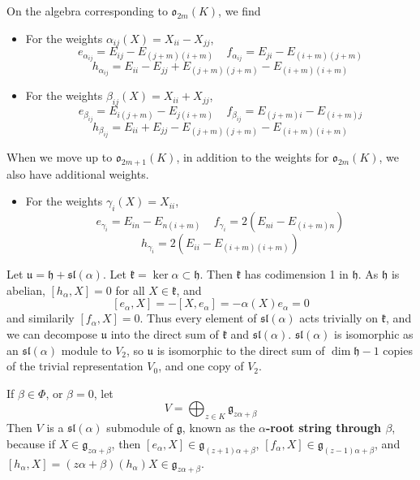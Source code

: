 \begin{example}
    On the algebra corresponding to $\mathfrak{o}_{2m}(K)$, we find
    \begin{itemize}
        \item For the weights $\alpha_{ij}(X) = X_{ii} - X_{jj}$,
        \[ e_{\alpha_{ij}} = E_{ij} - E_{(j+m)(i+m)}\ \ \ \ \ f_{\alpha_{ij}} = E_{ji} - E_{(i+m)(j+m)} \]
        \[ h_{\alpha_{ij}} = E_{ii} - E_{jj} + E_{(j+m)(j+m)} - E_{(i+m)(i+m)} \]

        \item For the weights $\beta_{ij}(X) = X_{ii} + X_{jj}$,
        \[ e_{\beta_{ij}} = E_{i(j+m)} - E_{j(i+m)}\ \ \ \ \ f_{\beta_{ij}} = E_{(j+m)i} - E_{(i+m)j} \]
        \[ h_{\beta_{ij}} = E_{ii} + E_{jj} - E_{(j+m)(j+m)} - E_{(i+m)(i+m)} \]
    \end{itemize}
    When we move up to $\mathfrak{o}_{2m+1}(K)$, in addition to the weights for $\mathfrak{o}_{2m}(K)$, we also have additional weights.
    \begin{itemize}
        \item For the weights $\gamma_i(X) = X_{ii}$,
        \[ e_{\gamma_i} = E_{in} - E_{n(i+m)}\ \ \ \ \ f_{\gamma_i} = 2(E_{ni} - E_{(i+m)n}) \]
        \[ h_{\gamma_i} = 2(E_{ii} - E_{(i+m)(i+m)}) \]
    \end{itemize}
\end{example}

\begin{example}
    Let $\mathfrak{u} = \mathfrak{h} + \mathfrak{sl}(\alpha)$. Let $\mathfrak{k} = \ker \alpha \subset \mathfrak{h}$. Then $\mathfrak{k}$ has codimension 1 in $\mathfrak{h}$. As $\mathfrak{h}$ is abelian, $[h_\alpha,X] = 0$ for all $X \in \mathfrak{k}$, and
    \[ [e_\alpha, X] = - [X, e_\alpha] = -\alpha(X) e_\alpha = 0 \]
    and similarily $[f_\alpha, X] = 0$. Thus every element of $\mathfrak{sl}(\alpha)$ acts trivially on $\mathfrak{k}$, and we can decompose $\mathfrak{u}$ into the direct sum of $\mathfrak{k}$ and $\mathfrak{sl}(\alpha)$. $\mathfrak{sl}(\alpha)$ is isomorphic as an $\mathfrak{sl}(\alpha)$ module to $V_2$, so $\mathfrak{u}$ is isomorphic to the direct sum of $\dim \mathfrak{h} - 1$ copies of the trivial representation $V_0$, and one copy of $V_2$.
\end{example}

\begin{example}
    If $\beta \in \Phi$, or $\beta = 0$, let
    \[ V = \bigoplus_{z \in K} \mathfrak{g}_{z\alpha + \beta} \]
    Then $V$ is a $\mathfrak{sl}(\alpha)$ submodule of $\mathfrak{g}$, known as the {\bf $\alpha$-root string through $\beta$}, because if $X \in \mathfrak{g}_{z\alpha + \beta}$, then $[e_\alpha, X] \in \mathfrak{g}_{(z + 1)\alpha + \beta}$, $[f_\alpha, X] \in \mathfrak{g}_{(z-1)\alpha + \beta}$, and $[h_\alpha,X] = (z\alpha + \beta)(h_\alpha) X \in \mathfrak{g}_{z\alpha + \beta}$.
\end{example}

